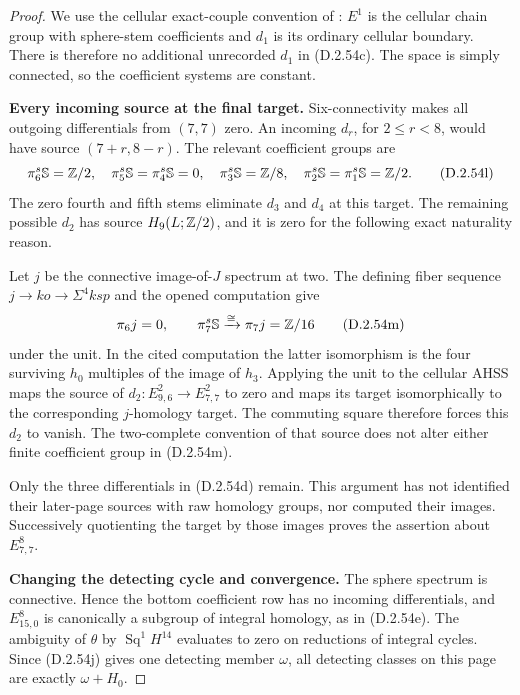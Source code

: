 \begin{proof}
We use the cellular exact-couple convention of
\cite[Part III, Section 7]{EH5Adams1974AHSS}:
$E^1$ is the cellular chain group with sphere-stem
coefficients and $d_1$ is its ordinary cellular
boundary.  There is therefore no additional unrecorded
$d_1$ in \textup{(D.2.54c)}.  The space is simply
connected, so the coefficient systems are constant.

\textbf{Every incoming source at the final target.}
Six-connectivity makes all outgoing differentials from
$(7,7)$ zero.  An incoming $d_r$, for $2\le r<8$,
would have source $(7+r,8-r)$.  The relevant coefficient
groups are
\[
 \pi_6^s\mathbb S=\mathbb Z/2,\quad
 \pi_5^s\mathbb S=\pi_4^s\mathbb S=0,\quad
 \pi_3^s\mathbb S=\mathbb Z/8,\quad
 \pi_2^s\mathbb S=\pi_1^s\mathbb S=\mathbb Z/2.
 \tag{D.2.54l}
\]
The zero fourth and fifth stems eliminate $d_3$ and
$d_4$ at this target.  The remaining possible $d_2$
has source $H_9(L;\mathbb Z/2)$, and it is zero for the
following exact naturality reason.

Let $j$ be the connective image-of-$J$ spectrum at two.
The defining fiber sequence
$j\to ko\to\Sigma^4ksp$ and the opened computation
\cite[Theorem 1.2 and Remark 1.3, pp.~2--3]
{EH5BrunerRognes2022} give
\[
                 \pi_6j=0,
       \qquad \pi_7^s\mathbb S\xrightarrow{\cong}\pi_7j=\mathbb Z/16
       \tag{D.2.54m}
\]
under the unit.  In the cited computation the latter
isomorphism is the four surviving $h_0$ multiples of
the image of $h_3$.  Applying the unit to the cellular
AHSS maps the source of $d_2:E^2_{9,6}\to E^2_{7,7}$
to zero and maps its target isomorphically to the
corresponding $j$-homology target.  The commuting square
therefore forces this $d_2$ to vanish.  The two-complete
convention of that source does not alter either finite
coefficient group in \textup{(D.2.54m)}.

Only the three differentials in
\textup{(D.2.54d)} remain.  This argument has not
identified their later-page sources with raw homology
groups, nor computed their images.  Successively
quotienting the target by those images proves the
assertion about $E^8_{7,7}$.

\textbf{Changing the detecting cycle and convergence.}
The sphere spectrum is connective.  Hence the bottom
coefficient row has no incoming differentials, and
$E^8_{15,0}$ is canonically a subgroup of integral
homology, as in \textup{(D.2.54e)}.  The ambiguity of
$\theta$ by $\operatorname{Sq}^1H^{14}$ evaluates to
zero on reductions of integral cycles.  Since
\textup{(D.2.54j)} gives one detecting member $\omega$,
all detecting classes on this page are exactly
$\omega+H_0$.


\end{proof}
